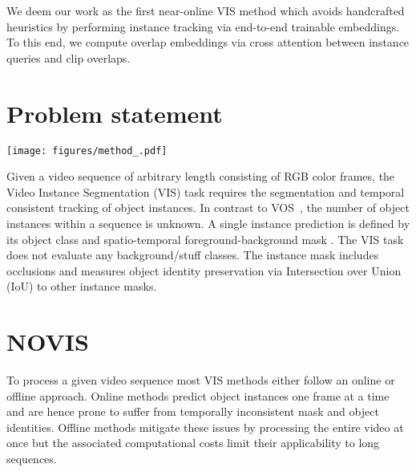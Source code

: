 \documentclass{article}
\newcommand{\method}{\mbox{NOVIS}}
\theoremstyle{plain}
\theoremstyle{definition}
\theoremstyle{remark}
\begin{document}
We deem our work as the first near-online VIS method which avoids handcrafted heuristics by performing instance tracking via end-to-end trainable embeddings.
To this end, we compute overlap embeddings via cross attention between instance queries and clip overlaps.
 \section{Problem statement}
\label{sec:problem_statement}

\begin{figure*}[t]
    \centering
    \texttt{[image: figures/method\_.pdf]}
    \vspace{-6mm}
    \caption{
Overview of our near-online \textbf{\method{}} model architecture and clip processing pipeline.
Given a video with length  and clips with overlap , our model first computes  per-frame feature scales via deformable attention in the \emph{pixel decoder}.
The feature scales of a clip are concatenated () to spatio-temporal volumes ().
Our \emph{video instance decoder} computes cross-attention between instance queries and feature volumes over  decoding layer.
The resulting output embeddings directly compute the object class and segmentation mask via a linear layer and dot product () with the -th feature scale, respectively.
We track instances between two clips by matching output embeddings via cosine similarity.
To improve results for objects with large trajectory changes, we match overlap embeddings computed on the shared frame features ().
    }
    \label{fig:method}
\end{figure*} 
Given a video sequence  of arbitrary length  consisting of RGB color frames, the Video Instance Segmentation (VIS) task requires the segmentation and temporal consistent tracking of object instances.
In contrast to VOS~\cite{ytvos}, the number of object instances within a sequence is unknown.
A single instance prediction  is defined by its object class  and spatio-temporal foreground-background mask .
The VIS task does not evaluate any background/stuff classes.
The instance mask  includes occlusions and measures object identity preservation via Intersection over Union (IoU) to other instance masks.
 \section{\method}
\label{sec:method}




To process a given video sequence most VIS methods either follow an online or offline approach.
Online methods predict object instances one frame at a time and are hence prone to suffer from temporally inconsistent mask and object identities.
Offline methods mitigate these issues by processing the entire video at once but the associated computational costs limit their applicability to long sequences.
\end{document}
